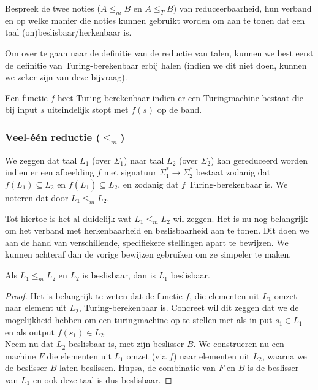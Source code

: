 \begin{quest}[Reduceerbaarheid]
	Bespreek de twee noties ($A \leq_m B$ en $A \leq_T B$) van reduceerbaarheid, hun verband en op welke manier die noties kunnen gebruikt worden om aan te tonen dat een taal (on)beslisbaar/herkenbaar is.
\end{quest}

Om over te gaan naar de definitie van de reductie van talen, kunnen we best eerst de definitie van Turing-berekenbaar erbij halen (indien we dit niet doen, kunnen we zeker zijn van deze bijvraag).

\begin{theorem}
	Een functie $f$ heet Turing berekenbaar indien er een Turingmachine bestaat die bij input $s$ uiteindelijk stopt met $f(s)$ op de band.
\end{theorem}

\subsubsection*{Veel-\'e\'en reductie ($\leq_m$)}

\begin{theorem}
	We zeggen dat taal $L_1$ (over $\Sigma_1$) naar taal $L_2$ (over $\Sigma_2$) kan gereduceerd worden indien er een afbeelding $f$ met signatuur $\Sigma^*_1\longrightarrow \Sigma^*_2$ bestaat zodanig dat $f(L_1) \subseteq L_2$ en $f(\overline{L_1}) \subseteq \overline{L_2}$, en zodanig dat $f$ Turing-berekenbaar is. We noteren dat door $L_1 \leq_m L_2$.
\end{theorem}

Tot hiertoe is het al duidelijk wat $L_1 \leq_m L_2$ wil zeggen. Het is nu nog belangrijk om het verband met herkenbaarheid en beslisbaarheid aan te tonen. Dit doen we aan de hand van verschillende, specifiekere stellingen apart te bewijzen. We kunnen achteraf dan de vorige bewijzen gebruiken om ze simpeler te maken.

\begin{theorem}
	Als $L_1 \leq_m L_2$ en $L_2$ is beslisbaar, dan is $L_1$ beslisbaar.
\end{theorem}

\begin{proof}
	Het is belangrijk te weten dat de functie $f$, die elementen uit $L_1$ omzet naar element uit $L_2$, Turing-berekenbaar is. Concreet wil dit zeggen dat we de mogelijkheid hebben om een turingmachine op te stellen met als in put $s_1 \in L_1$ en als output $f(s_1) \in L_2$.\\
	Neem nu dat $L_2$ beslisbaar is, met zijn beslisser $B$. We construeren  nu een machine $F$ die elementen uit $L_1$ omzet (via $f$) naar elementen uit $L_2$, waarna we de beslisser $B$ laten beslissen. Hupsa, de combinatie van $F$ en $B$ is de beslisser van $L_1$ en ook deze taal is dus beslisbaar.
\end{proof}

